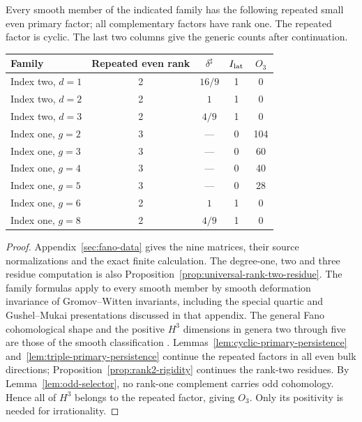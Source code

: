 \begin{proposition}
\label{prop:fano-endpoints}%
Every smooth member of the indicated family has the following repeated
small even primary factor; all complementary factors have rank one.
The repeated factor is cyclic. The last two columns give the generic
counts after continuation.
\begin{center}
\begin{tabular}{@{}lcccc@{}}
\toprule
Family & Repeated even rank & $\delta^\sharp$ & $I_{\rm lat}$ & $O_3$\\
\midrule
Index two, $d=1$ &2&$16/9$&1&0\\
Index two, $d=2$ &2&$1$&1&0\\
Index two, $d=3$ &2&$4/9$&1&0\\
Index one, $g=2$ &3&---&0&104\\
Index one, $g=3$ &3&---&0&60\\
Index one, $g=4$ &3&---&0&40\\
Index one, $g=5$ &3&---&0&28\\
Index one, $g=6$ &2&$1$&1&0\\
Index one, $g=8$ &2&$4/9$&1&0\\
\bottomrule
\end{tabular}
\end{center}
\end{proposition}
\begin{proof}
Appendix~\ref{sec:fano-data} gives the nine matrices, their source
normalizations and the exact finite calculation. The degree-one, two and
three residue computation is also Proposition~\ref{prop:universal-rank-two-residue}.
The family formulas apply to every smooth member by smooth deformation
invariance of Gromov--Witten invariants, including the special quartic and
Gushel--Mukai presentations discussed in that appendix.
The general Fano cohomological shape and the positive $H^3$ dimensions in
genera two through five are those of the smooth classification
\cite[Introduction and Table~5]{KuznetsovProkhorovNodal}.
Lemmas~\ref{lem:cyclic-primary-persistence} and~\ref{lem:triple-primary-persistence}
continue the repeated factors in all even bulk directions;
Proposition~\ref{prop:rank2-rigidity} continues the rank-two residues.
By Lemma~\ref{lem:odd-selector}, no rank-one complement carries odd
cohomology. Hence all of $H^3$ belongs to the repeated factor, giving $O_3$.
Only its positivity is needed for irrationality.
%
%
%
\end{proof}

